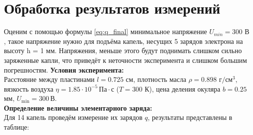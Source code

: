 \documentclass{lab}
\begin{document}
\section{Обработка результатов измерений}
Оценим с помощью формулы \eqref{eq:q_final} минимальное напряжение $U_{min} = 300 \text{ В}$, такое напряжение нужно для подъёма капель, несущих 5 зарядов электрона на высоту h = 1 мм. Напряжения, меньше этого будут поднимать слишком сильно заряженные капли, что приведёт к неточности эксперимента и слишком большим погрешностям.
\noindent
\textbf{Условия эксперимента:}
\\
Расстояние между пластинами $l = 0.725$ см, плотность масла $\rho = 0.898 \,\, \text{г}/\text{см}^3$, вязкость воздуха $\eta = 1.85 \cdot 10^{-5} \, \text{Па} \cdot \text{с}$ ($T = 300$ К), цена деления окуляра $b = 0.25$ мм, $U_\text{min} = 300 \, \text{В}$.
\\
\textbf{Определение величины элементарного заряда:}
\\
Для 14 капель проведём измерение их зарядов $q$, результаты представлены в таблице:
\end{document}
